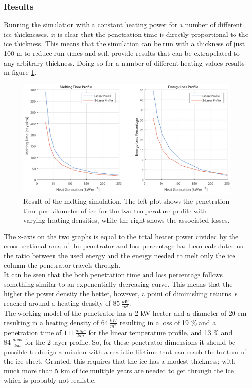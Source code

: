 \subsubsection{Results}
Running the simulation with a constant heating power for a number of different ice thicknesses, it is clear that the penetration time is directly proportional to the ice thickness. This means that the simulation can be run with a thickness of just 100 m to reduce run times and still provide results that can be extrapolated to any arbitrary thickness. Doing so for a number of different heating values results in figure \ref{fig:simResults}.

\begin{figure}[ht]
	\centering
	\includegraphics[width=.9\textwidth]{figures/LAMC/simResult.pdf}
	\caption{Result of the melting simulation. The left plot shows the penetration time per kilometer of ice for the two temperature profile with varying heating densities, while the right shows the associated losses.}
	\label{fig:simResults}
\end{figure}

\noindent
The x-axis on the two graphs is equal to the total heater power divided by the cross-sectional area of the penetrator and loss percentage has been calculated as the ratio between the used energy and the energy needed to melt only the ice column the penetrator travels through. \\

\noindent
It can be seen that the both penetration time and loss percentage follows something similar to an exponentially decreasing curve. This means that the higher the power density the better, however, a point of diminishing returns is reached around a heating density of $\SI{85}{\frac{kW}{m^2}}$. \\

\noindent
The working model of the penetrator has a 2 kW heater and a diameter of 20 cm resulting in a heating density of $\SI{64}{\frac{kW}{m^2}}$ resulting in a loss of 19 \% and a penetration time of $\SI{111}{\frac{days}{km}}$ for the linear temperature profile, and 13 \% and $\SI{84}{\frac{days}{km}}$ for the 2-layer profile. So, for these penetrator dimensions it should be possible to design a mission with a realistic lifetime that can reach the bottom of the ice sheet. Granted, this requires that the ice has a modest thickness; with much more than 5 km of ice multiple years are needed to get through the ice which is probably not realistic.\\


